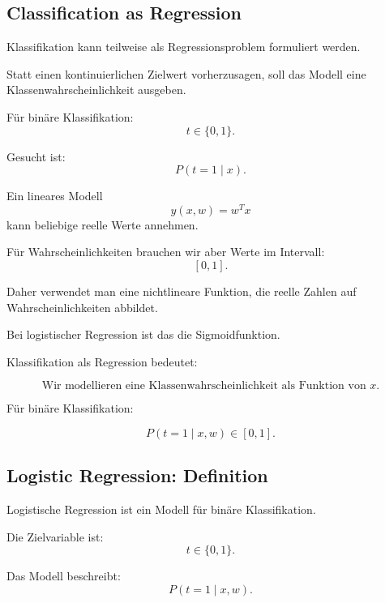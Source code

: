 \documentclass[11pt,a4paper]{scrartcl}
\begin{document}
\subsection{Classification as Regression}

\begin{notebox}
    Klassifikation kann teilweise als Regressionsproblem formuliert werden.

    Statt einen kontinuierlichen Zielwert vorherzusagen, soll das Modell eine
    Klassenwahrscheinlichkeit ausgeben.

    Für binäre Klassifikation:
    \[
        t \in \{0,1\}.
    \]

    Gesucht ist:
    \[
        P(t=1 \mid x).
    \]
\end{notebox}

\begin{solutionbox}
    Ein lineares Modell
    \[
        y(x,w)=w^Tx
    \]
    kann beliebige reelle Werte annehmen.

    Für Wahrscheinlichkeiten brauchen wir aber Werte im Intervall:
    \[
        [0,1].
    \]

    Daher verwendet man eine nichtlineare Funktion, die reelle Zahlen auf
    Wahrscheinlichkeiten abbildet.

    Bei logistischer Regression ist das die Sigmoidfunktion.
\end{solutionbox}

\begin{answerbox}
    Klassifikation als Regression bedeutet:

    \[
        \boxed{
            \text{Wir modellieren eine Klassenwahrscheinlichkeit als Funktion von } x.
        }
    \]

    Für binäre Klassifikation:

    \[
        \boxed{
            P(t=1 \mid x,w)
            \in [0,1].
        }
    \]
\end{answerbox}

\subsection{Logistic Regression: Definition}

\begin{notebox}
    Logistische Regression ist ein Modell für binäre Klassifikation.

    Die Zielvariable ist:
    \[
        t \in \{0,1\}.
    \]

    Das Modell beschreibt:
    \[
        P(t=1 \mid x,w).
    \]
\end{notebox}
\end{document}
